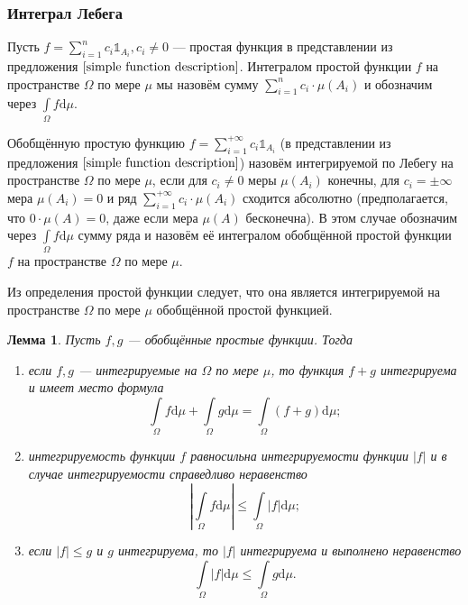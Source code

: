 \documentclass[12pt]{article}
\newtheorem{lemma}[theorem]{Лемма}
\numberwithin{theorem}{section}
\theoremstyle{definition}
\newcommand{\defin}[2]{\hypertarget{#2}{{\color{red} #1}}}
\newcommand{\ind}{\mathds{1}}
\newcommand{\diff}{\mathrm{d}}
\begin{document}
	
	\subsubsection{Интеграл Лебега}
	
	Пусть $ f = \sum\limits_{i = 1}^{n}c_i\ind_{A_i}, c_i \neq 0 $ --- простая функция в представлении из предложения
	$ \ref{simple function description} $.
	\defin{Интегралом простой функции $ f $ на пространстве $ \Omega $ по мере $ \mu $}{simple-function-integral} 
	мы назовём сумму $ \sum\limits_{i = 1}^{n} c_i\cdot\mu(A_i) $ и обозначим через $ \int\limits_{\Omega} f\diff\mu $.
	
	Обобщённую простую функцию $ f = \sum\limits_{i = 1}^{+\infty}c_i\ind_{A_i} $ (в представлении из предложения
	$ \ref{simple function description} $) назовём 
	\defin{интегрируемой по Лебегу на пространстве $ \Omega $ по мере $ \mu $}{generalized-simple-function-integrability},
	если для $ c_i \neq 0 $ меры $ \mu(A_i) $ конечны, для $ c_i = \pm\infty $ мера $ \mu(A_i) = 0 $ и 
	ряд $ \sum\limits_{i = 1}^{+\infty} c_i\cdot\mu(A_i) $ сходится абсолютно (предполагается, что $ 0 \cdot \mu(A) = 0 $, даже если мера $ \mu(A) $ бесконечна).
	В этом случае обозначим через $ \int\limits_{\Omega} f\diff\mu $ сумму ряда и назовём её
	\defin{интегралом обобщённой простой функции $ f $ на пространстве $ \Omega $ по мере $ \mu $}{generalized-simple-function-integral}. 
	
	Из определения простой функции следует, что она является интегрируемой на пространстве $ \Omega $ по мере $ \mu $
	обобщённой простой функцией.
	
	\begin{lemma} \label{integrability of generalized simple functions}
		Пусть $ f, g $ ---  обобщённые простые функции.
		Тогда
		\begin{enumerate}
			\item если $ f, g $ --- интегрируемые на $ \Omega $ по мере $ \mu $, 
			то функция $ f + g $ интегрируема и имеет место формула
			$$ \int\limits_{\Omega} f\diff\mu + \int\limits_{\Omega} g\diff\mu = \int\limits_{\Omega} (f + g)\diff\mu; $$
			\item интегрируемость функции $ f $ равносильна интегрируемости функции $ |f| $ 
			и в случае интегрируемости справедливо неравенство
			$$ \left|\int\limits_{\Omega} f\diff\mu\right| \leqslant \int\limits_{\Omega} |f|\diff\mu; $$
			\item если $ |f| \leqslant g $ и $ g $ интегрируема, то $ |f| $ интегрируема и выполнено неравенство
			$$ \int\limits_{\Omega} |f|\diff\mu \leqslant \int\limits_{\Omega} g\diff\mu. $$
		\end{enumerate}
	\end{lemma}
	
\end{document}
